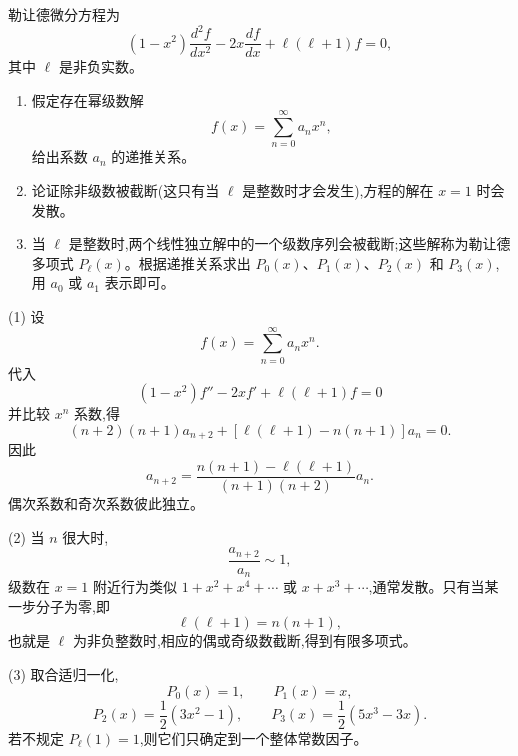 \begin{question}
勒让德微分方程为
\[
(1-x^2)\frac{d^2f}{dx^2}-2x\frac{df}{dx}+\ell(\ell+1)f=0,
\]
其中 $\ell$ 是非负实数。
\begin{enumerate}
\item 假定存在幂级数解
\[
f(x)=\sum_{n=0}^{\infty}a_nx^n,
\]
给出系数 $a_n$ 的递推关系。
\item 论证除非级数被截断(这只有当 $\ell$ 是整数时才会发生),方程的解在 $x=1$ 时会发散。
\item 当 $\ell$ 是整数时,两个线性独立解中的一个级数序列会被截断;这些解称为勒让德多项式 $P_\ell(x)$。根据递推关系求出 $P_0(x)$、$P_1(x)$、$P_2(x)$ 和 $P_3(x)$,用 $a_0$ 或 $a_1$ 表示即可。
\end{enumerate}
\end{question}
\begin{solution}
(1) 设
\[
f(x)=\sum_{n=0}^{\infty}a_nx^n.
\]
代入
\[
(1-x^2)f''-2xf'+\ell(\ell+1)f=0
\]
并比较 $x^n$ 系数,得
\[
(n+2)(n+1)a_{n+2}+[\ell(\ell+1)-n(n+1)]a_n=0.
\]
因此
\[
a_{n+2}=\frac{n(n+1)-\ell(\ell+1)}{(n+1)(n+2)}a_n.
\]
偶次系数和奇次系数彼此独立。

(2) 当 $n$ 很大时,
\[
\frac{a_{n+2}}{a_n}\sim1,
\]
级数在 $x=1$ 附近行为类似 $1+x^2+x^4+\cdots$ 或 $x+x^3+\cdots$,通常发散。只有当某一步分子为零,即
\[
\ell(\ell+1)=n(n+1),
\]
也就是 $\ell$ 为非负整数时,相应的偶或奇级数截断,得到有限多项式。

(3) 取合适归一化,
\[
P_0(x)=1,
\qquad
P_1(x)=x,
\]
\[
P_2(x)=\frac12(3x^2-1),
\qquad
P_3(x)=\frac12(5x^3-3x).
\]
若不规定 $P_\ell(1)=1$,则它们只确定到一个整体常数因子。
\end{solution}
